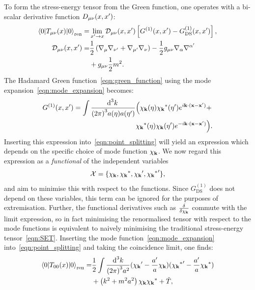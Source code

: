 To form the stress-energy tensor from the Green function, one operates with a bi-scalar derivative function $D_{\mu\nu}(x,\prm{x})$:
\begin{align}
  \bracket{0}{T_{\mu\nu}(x)}{0}_\mathrm{ren} =& \lim\limits_{\prm{x}\to x} \mathcal{D}_{\mu\nu}(x,\prm{x}) \left[ G^{(1)}(x,\prm{x}) - G^{(1)}_\mathrm{DS}(x,\prm{x}) \right],
  \label{eqn:point_splitting}
  \\
  \mathcal{D}_{\mu\nu}(x,\prm{x})=& \frac{1}{2}\left( \nabla_{\mu}\nabla_{\prm{\nu}} + \nabla_{\prm{\mu}}\nabla_{\nu} \right) -\frac{1}{2} g_{\mu\nu} \nabla_\alpha \nabla^{\prm{\alpha}} \nonumber\\
  &+ g_{\mu\nu} \frac{1}{2}m^2.  \nonumber
\end{align}
The Hadamard Green function~\eqref{eqn:green_function} using the mode expansion~\eqref{eqn:mode_expansion} becomes:
\begin{align}
  G^{(1)}(x,\prm{x}) = 
  \int\frac{\d[3]{k}\:}{{(2\pi)}^3a(\eta)a(\prm{\eta})}&
  \Big(
  \chi_\vk(\eta)
  \str{\chi_{\vk}}(\prm{\eta})e^{i\vk\cdot(\vx-\prm{\vx})}+\nonumber\\
  &
  \str{\chi_\vk}(\eta)
  \chi_{\vk}(\prm{\eta})e^{-i\vk\cdot(\vx-\prm{\vx})}
  \Big).
  \nonumber
\end{align}
Inserting this expression into~\eqref{eqn:point_splitting} will yield an expression which depends on the specific choice of mode function $\chi_\vk$. We now regard this expression as a {\em functional\/} of the independent variables 
\begin{equation}
  \mathcal{X} = \{\chi_\vk,\str{\chi_\vk},\prm{\chi_\vk},\prm{\str{\chi_\vk}}\},
  \label{eqn:vars}
\end{equation}
and aim to minimise this with respect to the functions. Since $G^{(1)}_{\mathrm{DS}}$ does not depend on these variables, this term can be ignored for the purposes of extremisation. Further, the functional derivatives such as $\frac{\delta}{\delta \chi_\vk}$ commute with the limit expression, so in fact minimising the renormalised tensor with respect to the mode functions is equivalent to naively minimising the traditional stress-energy tensor~\eqref{eqn:SET}. Inserting the mode function~\eqref{eqn:mode_expansion} into~\eqref{eqn:point_splitting} and taking the coincidence limit, one finds:
\begin{align}
  \bracket{0}{T_{00}(x)}{0}_\mathrm{ren} = &\frac{1}{2}\int \frac{\d[3]{k}}{{(2\pi)}^3 a^2} (\prm{\chi_\vk}-\frac{\prm{a}}{a}\chi_\vk)(\prm{\str{\chi_\vk}}-\frac{\prm{a}}{a}\str{\chi_\vk})
  \nonumber \\
  &+\left( k^2 + m^2a^2 \right)\chi_\vk {\chi_\vk}^\ast + \tilde{T},
\end{align}
